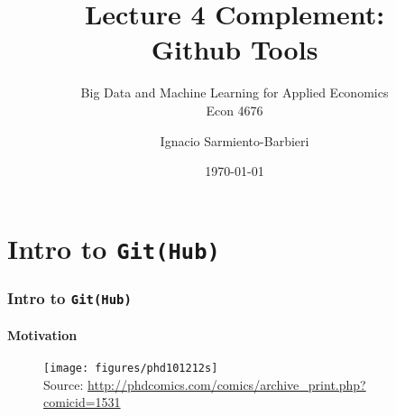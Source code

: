 \documentclass[
  shownotes,
  xcolor={svgnames},
  hyperref={colorlinks,citecolor=DarkBlue,linkcolor=DarkRed,urlcolor=DarkBlue}
  ]{beamer}
\begin{document}
\title[Lecture 4]{Lecture 4 Complement:  \\ Github Tools}
\subtitle{Big Data and Machine Learning for Applied Economics \\ Econ 4676}
\date{\today}

\author[Sarmiento-Barbieri]{Ignacio Sarmiento-Barbieri}


\begin{frame}[noframenumbering]
\maketitle
\end{frame}






\section{ Intro to \texttt{Git(Hub)}}
\begin{frame}
\frametitle{ Intro to \texttt{Git(Hub)}}
\framesubtitle{Motivation}

\begin{figure}[H] \centering
  \centering
  \texttt{[image: figures/phd101212s]}
  \\
  \tiny
  Source: \url{http://phdcomics.com/comics/archive_print.php?comicid=1531}
\end{figure}



\end{frame}
\end{document}
